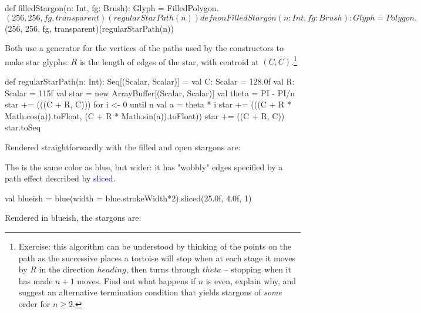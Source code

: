 \documentclass[12pt,a4paper]{article}
\def\Scala#1{\textcolor{blue}{\textsf{#1}}}
\begin{document}
\begin{scala}
 def filledStargon(n: Int, fg: Brush): Glyph =
     FilledPolygon.$(256, 256, fg, transparent)(regularStarPath(n))                        
   
 def nonFilledStargon(n: Int, fg: Brush): Glyph =
     Polygon.$(256, 256, fg, transparent)(regularStarPath(n))                    
\end{scala}


Both use a generator for the vertices of the paths used by
the  constructors to make star glyphs: $R$ is the
length of edges of the star, with centroid at $(C,C)$.\footnote{Exercise: this
algorithm can be understood by thinking of the points on
the path as the successive places a tortoise will stop when
at each stage it moves by $R$ in the direction $heading$, then turns through
$theta$ -- stopping when it has made $n+1$ moves.
Find out what happens if $n$ is even, explain why, and suggest
an alternative termination condition that yields stargons of \textit{some} order for
$n\ge{}2$. }

\begin{scala}
def regularStarPath(n: Int): Seq[(Scalar, Scalar)] = {
    val C: Scalar = 128.0f
    val R: Scalar = 115f
    val star = new ArrayBuffer[(Scalar, Scalar)]
    val theta = PI - PI/n
    star += (((C + R, C)))
    for {i <- 0 until n} {
      val a = theta * i
      star += (((C + R * Math.cos(a)).toFloat, (C + R * Math.sin(a)).toFloat))
    }
    star += ((C + R, C))
    star.toSeq
  }
\end{scala}

Rendered straightforwardly with  the filled and open stargons are:
\begin{center}
\quad\quad
{}
\end{center}


 The   is the same color as blue, but wider: it
 has "wobbly" edges specified by a path effect described by \Scala{sliced}.

\begin{scala}
  val blueish =
        blue(width = blue.strokeWidth*2).sliced(25.0f, 4.0f, 1)
\end{scala}

Rendered in blueish, the stargons are:
\begin{center}
\quad\quad
{}
\end{center}
\end{document}
